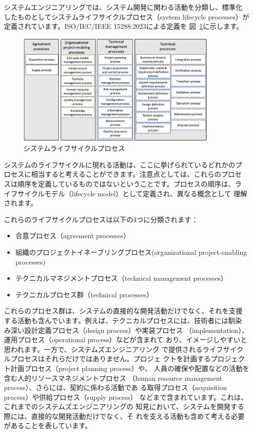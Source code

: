 システムエンジニアリングでは、システム開発に関わる活動を分類し、標準化
したものとしてシステムライフサイクルプロセス（system lifecycle
  processes）が定義されています。ISO/IEC/IEEE 15288:2023による定義を
図~\ref{figure:ch4-2}に示します。
\begin{figure}
    \begin{center}
    \includegraphics[width=100mm,bb=0 0 756 424]{safety_assurance_contents/ch4images/fig2.png}
    \caption{システムライフサイクルプロセス}
    \label{figure:ch4-2}
    \end{center}
\end{figure}

システムのライフサイクルに現れる活動は、ここに挙げられているどれかのプ
ロセスに相当すると考えることができます。注意点としては、これらのプロセ
スは順序を定義しているものではないということです。プロセスの順序は、ラ
イフサイクルモデル（lifecycle model）として定義され、異なる概念として
理解されます。

これらのライフサイクルプロセスは以下の4つに分類されます：

\begin{itemize}
    \item 合意プロセス（agreement processes）
    \item 組織のプロジェクトイネーブリングプロセス(organizational project-enabling processes)
    \item テクニカルマネジメントプロセス（technical management processes）
    \item テクニカルプロセス群（technical processes）
\end{itemize}

これらのプロセス群は、システムの直接的な開発活動だけでなく、それを支援
する活動も含んでいます。例えば、テクニカルプロセスには、技術者には馴染
み深い設計定義プロセス（design process）や実装プロセス
（implementation）、運用プロセス（operational process）などが含まれて
おり、イメージしやすいと思われます。一方で、システムズエンジニアリング
で提供されるライフサイクルプロセスはそれらだけではありません。プロジェ
クトを計画するプロジェクト計画プロセス（project planning process）や、
人員の確保や配置などの活動を含む人的リソースマネジメントプロセス
（human resource management process）、さらには、契約に係わる活動であ
る取得プロセス（acquisition process）や供給プロセス（supply process）
などまで含まれています。これは、これまでのシステムズエンジニアリングの
知見において、システムを開発する際には、直接的な開発活動だけでなく、そ
れを支える活動も含めて考える必要があることを表しています。

